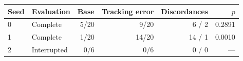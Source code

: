 \begin{tabular}{llrrrr}
\toprule
Seed & Evaluation & Base & Tracking error & Discordances & $p$ \\
\midrule
0 & Complete & 5/20 & 9/20 & 6 / 2 & 0.2891 \\
1 & Complete & 1/20 & 14/20 & 14 / 1 & 0.0010 \\
2 & Interrupted & 0/6 & 0/6 & 0 / 0 & --- \\
\bottomrule
\end{tabular}
